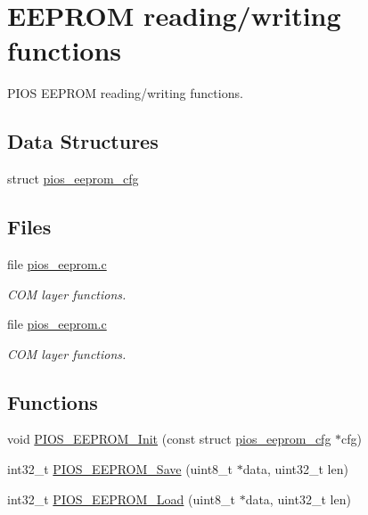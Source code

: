 \hypertarget{group___p_i_o_s___e_e_p_r_o_m}{\section{\-E\-E\-P\-R\-O\-M reading/writing functions}
\label{group___p_i_o_s___e_e_p_r_o_m}
}


\-P\-I\-O\-S \-E\-E\-P\-R\-O\-M reading/writing functions.  


\subsection*{\-Data \-Structures}
\begin{DoxyCompactItemize}
\item 
struct \hyperlink{structpios__eeprom__cfg}{pios\-\_\-eeprom\-\_\-cfg}
\end{DoxyCompactItemize}
\subsection*{\-Files}
\begin{DoxyCompactItemize}
\item 
file \hyperlink{pios__eeprom_8c}{pios\-\_\-eeprom.\-c}
\begin{DoxyCompactList}\small\item\em \-C\-O\-M layer functions. \end{DoxyCompactList}\item 
file \hyperlink{pios__eeprom_8c}{pios\-\_\-eeprom.\-c}
\begin{DoxyCompactList}\small\item\em \-C\-O\-M layer functions. \end{DoxyCompactList}\end{DoxyCompactItemize}
\subsection*{\-Functions}
\begin{DoxyCompactItemize}
\item 
void \hyperlink{group___p_i_o_s___e_e_p_r_o_m_ga89a716e16ce15d30ee420d5d0a2a3cd8}{\-P\-I\-O\-S\-\_\-\-E\-E\-P\-R\-O\-M\-\_\-\-Init} (const struct \hyperlink{structpios__eeprom__cfg}{pios\-\_\-eeprom\-\_\-cfg} $\ast$cfg)
\item 
int32\-\_\-t \hyperlink{group___p_i_o_s___e_e_p_r_o_m_ga324767758d92c2fa9701b4ae023362b2}{\-P\-I\-O\-S\-\_\-\-E\-E\-P\-R\-O\-M\-\_\-\-Save} (uint8\-\_\-t $\ast$data, uint32\-\_\-t len)
\item 
int32\-\_\-t \hyperlink{group___p_i_o_s___e_e_p_r_o_m_ga2158356e9d0a6a63ba08dfc59492fce8}{\-P\-I\-O\-S\-\_\-\-E\-E\-P\-R\-O\-M\-\_\-\-Load} (uint8\-\_\-t $\ast$data, uint32\-\_\-t len)
\end{DoxyCompactItemize}


